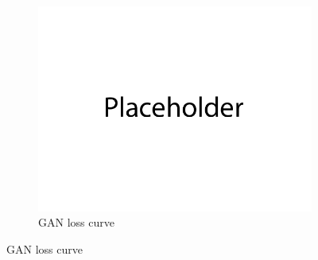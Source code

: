 \documentclass{article}
\begin{document}
\begin{enumerate}[(a)]
\begin{figure}[H]
    \\
    \begin{subfigure}{0.34\textwidth}
        \centering
        \includegraphics[width=\textwidth]{figures/q1b_losses.png}
        \caption{GAN loss curve}
    \end{subfigure}
\end{figure}
\end{enumerate}



\newpage
{}


\\
\end{document}
